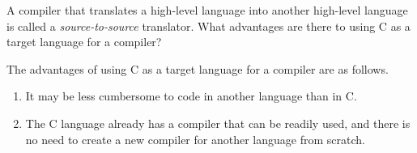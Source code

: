 \begin{exercise}\label{ex:010104}
    A compiler that translates a high-level language into another high-level 
    language is called a \textit{source-to-source} translator. What advantages 
    are there to using C as a target language for a compiler?
\end{exercise}
\begin{solution}\label{sol:010104}
    The advantages of using C as a target language for a compiler are as follows.
    \begin{enumerate}
        \item It may be less cumbersome to code in another language than in C.
        \item The C language already has a compiler that can be readily used, 
        and there is no need to create a new compiler for another language from 
        scratch.
    \end{enumerate}
\end{solution}